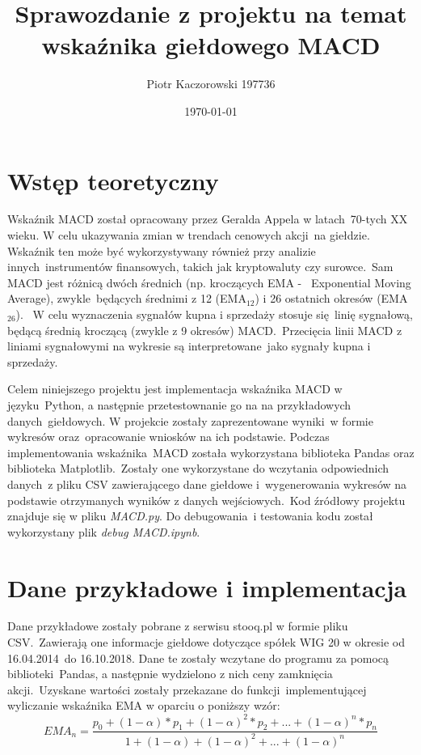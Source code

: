 \documentclass{article}
\title{Sprawozdanie z projektu na temat wskaźnika giełdowego MACD}
\author{Piotr Kaczorowski 197736}
\date{\today}
\begin{document}
\maketitle

\section{Wstęp teoretyczny}

Wskaźnik MACD został opracowany przez Geralda Appela w latach\
70-tych XX wieku. W celu ukazywania zmian w trendach cenowych akcji\
na giełdzie. Wskaźnik ten może być wykorzystywany również przy analizie innych\
instrumentów finansowych, takich jak kryptowaluty czy surowce.\
Sam MACD jest różnicą dwóch średnich (np. kroczących EMA - \
Exponential Moving Average), zwykle\
będących średnimi z 12 (EMA$_{12}$) i 26 ostatnich okresów (EMA$_{26}$). \
W celu wyznaczenia sygnałów kupna i sprzedaży stosuje się\
linię sygnałową, będącą średnią kroczącą (zwykle z 9 okresów) MACD.\
Przecięcia linii MACD z liniami sygnałowymi na wykresie są interpretowane\
jako sygnały kupna i sprzedaży.

Celem niniejszego projektu jest implementacja wskaźnika MACD w języku\
Python, a następnie przetestownanie go na na przykładowych danych\
giełdowych. W projekcie zostały zaprezentowane wyniki\
w formie wykresów oraz\
opracowanie wniosków na ich podstawie. Podczas implementowania wskaźnika\
MACD została wykorzystana biblioteka Pandas oraz biblioteka Matplotlib.\
Zostały one wykorzystane do wczytania odpowiednich danych\
z pliku CSV zawierającego dane giełdowe i\
wygenerowania wykresów na podstawie otrzymanych wyników z danych wejściowych.\
Kod źródłowy projektu znajduje się w pliku \emph{MACD.py}. Do debugowania\
i testowania kodu został wykorzystany plik \emph{debug MACD.ipynb}.


\section{Dane przykładowe i implementacja}

Dane przykładowe zostały pobrane z serwisu stooq.pl w formie pliku CSV.\
Zawierają one informacje giełdowe dotyczące spółek WIG 20 w okresie od 16.04.2014\
do 16.10.2018. Dane te zostały wczytane do programu za pomocą biblioteki\
Pandas, a następnie wydzielono z nich ceny zamknięcia akcji.\
Uzyskane wartości zostały przekazane do funkcji\
implementującej wyliczanie wskaźnika EMA w oparciu o poniższy wzór:
\begin{equation}
    EMA_n = \frac{p_0+(1-\alpha)*p_1+(1-\alpha)^2*p_2+...+(1-\alpha)^n*p_n}{1+(1-\alpha)+(1-\alpha)^2+...+(1-\alpha)^n}
\end{equation}
\end{document}
